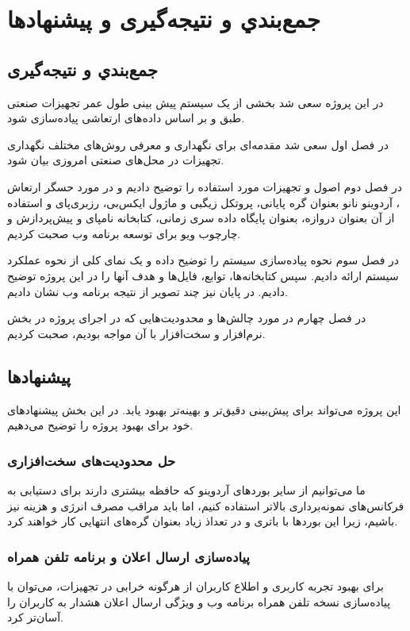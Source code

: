 \chapter{جمع‌بندي و نتيجه‌گيری و پیشنهادها}
\section{جمع‌بندي و نتيجه‌گيری}

در این پروژه سعی شد بخشی از یک سیستم پیش بینی طول عمر تجهیزات صنعتی طبق \cite{jung2017vibration} و بر اساس داده‌های ارتعاشی پیاده‌سازی شود.

در فصل اول سعی شد مقدمه‌ای برای نگهداری و معرفی روش‌های مختلف نگهداری تجهیزات در محل‌‌های صنعتی امروزی بیان شود.

در فصل دوم اصول و تجهیزات مورد استفاده را توضیح دادیم و در مورد حسگر ارتعاش ، آردوینو نانو بعنوان گره پایانی، پروتکل زیگبی و ماژول ایکس‌بی، رزبری‌پای و استفاده از آن بعنوان دروازه،  بعنوان پایگاه داده سری زمانی، کتابخانه نامپای و پیش‌پردازش و چارچوب ویو برای توسعه برنامه وب صحبت کردیم.

در فصل سوم نحوه پیاده‌سازی سیستم را توضیح داده و یک نمای کلی از نحوه عملکرد سیستم ارائه دادیم. سپس کتابخانه‌ها، توابع، فایل‌ها و هدف آنها را در این پروژه توضیح دادیم. در پایان نیز چند تصویر از نتیجه برنامه وب نشان دادیم.

در فصل چهارم در مورد چالش‌ها و محدودیت‌هایی که در اجرای پروژه در بخش نرم‌افزار و سخت‌افزار با آن مواجه بودیم، صحبت کردیم.

\section{پیشنهادها}

این پروژه می‌تواند برای پیش‌بینی دقیق‌تر و بهینه‌تر بهبود یابد. در این بخش پیشنهادهای خود برای بهبود پروژه را توضیح می‌دهیم.

\subsection{حل محدودیت‌های سخت‌افزاری}

ما می‌توانیم از سایر بوردهای آردوینو که حافظه بیشتری دارند برای دستیابی به فرکانس‌های نمونه‌برداری بالاتر استفاده کنیم، اما باید مراقب مصرف انرژی و هزینه نیز باشیم، زیرا این بوردها با باتری و در تعداذ زیاد بعنوان گره‌های انتهایی کار خواهند کرد.

\subsection{پیاده‌سازی ارسال اعلان و برنامه تلفن همراه}
برای بهبود تجربه کاربری و اطلاع کاربران از هرگونه خرابی در تجهیزات، می‌توان با پیاده‌سازی نسخه تلفن همراه برنامه وب و ویژگی ارسال اعلان هشدار به کاربران را آسان‌تر کرد.

